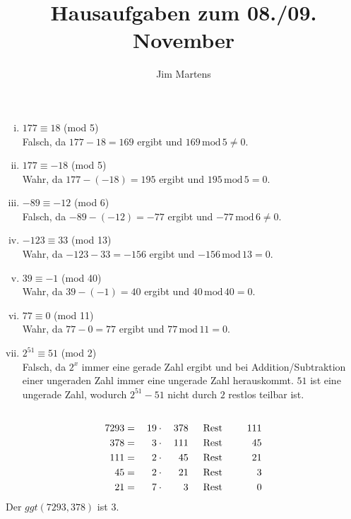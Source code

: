 \documentclass[10pt,a4paper,oneside,ngerman,numbers=noenddot]{scrartcl}
\begin{document}
\author{Jim Martens}
\title{Hausaufgaben zum 08./09. November}
\maketitle
\section{} 
\subsection{}
\begin{enumerate}[(i)]
\item $177 \equiv 18$ (mod 5) \\
Falsch, da $177-18=169$ ergibt und $169\, \text{mod}\, 5 \neq 0$.
\item $177 \equiv -18$ (mod 5) \\
Wahr, da $177-(-18)=195$ ergibt und $195\, \text{mod}\, 5 = 0$.
\item $-89 \equiv -12$ (mod 6) \\
Falsch, da $-89-(-12)=-77$ ergibt und $-77\, \text{mod}\, 6 \neq 0$.
\item $-123 \equiv 33$ (mod 13) \\
Wahr, da $-123-33=-156$ ergibt und $-156\, \text{mod}\, 13 = 0$.
\item $39 \equiv -1$ (mod 40) \\
 Wahr, da $39-(-1)=40$ ergibt und $40\, \text{mod}\, 40 = 0$.
\item $77 \equiv 0$ (mod 11) \\
Wahr, da $77-0=77$ ergibt und $77\, \text{mod}\, 11 = 0$.
\item $2^{51} \equiv 51$ (mod 2) \\
Falsch, da $2^{x}$ immer eine gerade Zahl ergibt und bei Addition/Subtraktion einer ungeraden Zahl immer eine ungerade Zahl herauskommt. $51$ ist eine ungerade Zahl, wodurch $2^{51}-51$ nicht durch $2$ restlos teilbar ist.
\end{enumerate}
\subsection{}
\begin{alignat}{4}
7293& =&\: 19 &\: \cdot &\: 378& \indent\text{Rest}&\indent 111\\
378& =&\: 3 &\: \cdot &\: 111& \indent\text{Rest}&\indent 45\\
111& =&\: 2 &\: \cdot &\: 45& \indent\text{Rest}&\indent 21\\
45& =&\: 2 &\: \cdot &\: 21& \indent\text{Rest}&\indent 3\\
21& =&\: 7 &\: \cdot &\: 3& \indent\text{Rest}&\indent 0
\end{alignat}
Der $ggt(7293,378)$ ist $3$.
\end{document}
